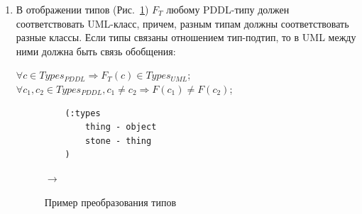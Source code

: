 \documentclass[a4paper,14pt]{extreport}
\begin{document}
    \begin{enumerate}
        \item В отображении типов (Рис.~\ref{img:property-types}) $F_T$ любому PDDL-типу должен соответствовать UML-класс, причем, разным типам должны соответствовать разные классы. Если типы связаны отношением тип-подтип, то в UML между ними должна быть связь обобщения:
    
        \begin{center}
            $\forall c \in Types_{PDDL} \Rightarrow F_T(c) \in Types_{UML}$; \\
            $\forall c_1, c_2 \in Types_{PDDL}, c_1 \neq c_2 \Rightarrow F(c_1) \neq F(c_2)$;
        \end{center}
                 

        
\begin{figure}[h]
    \hfill
    \begin{minipage}[h]{0.40\linewidth}
        {\raggedright
        \begin{verbatim}
    (:types
        thing - object
        stone - thing
    )
        \end{verbatim} 
        }
    \end{minipage}
    \hfill
    $\rightarrow$
    \hfill
    \begin{minipage}[h]{0.45\linewidth}
    \end{minipage}
    \caption{Пример преобразования типов}
    \label{img:property-types}
\end{figure}
   


\end{enumerate}
\end{document}
